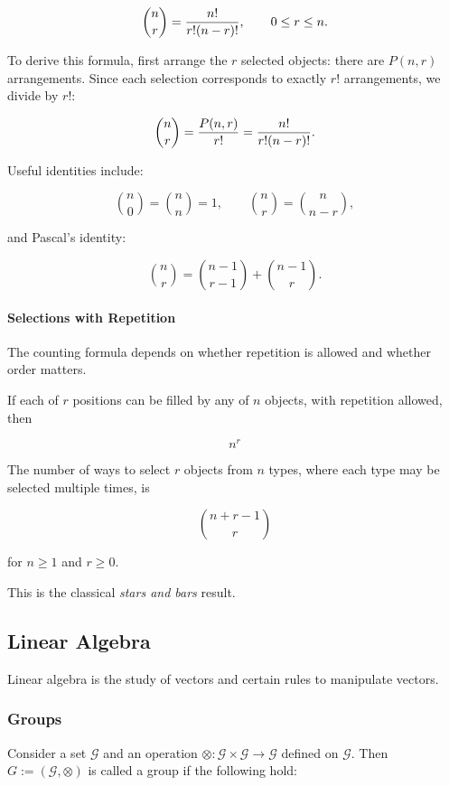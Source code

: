 \documentclass{article}
\begin{document}
\[
    \binom{n}{r} = \frac{n!}{r!(n-r)!}, \\
    \qquad 0 \leq r \leq n.
\]

To derive this formula, first arrange the \(r\) selected objects: there
are \(P(n,r)\) arrangements. Since each selection corresponds to exactly
\(r!\) arrangements, we divide by \(r!\):

\[
    \binom{n}{r} \\
    = \frac{P(n,r)}{r!} \\
    = \frac{n!}{r!(n-r)!}.
\]

Useful identities include:

\[
    \binom{n}{0} = \binom{n}{n} = 1,
    \qquad
    \binom{n}{r} = \binom{n}{n-r},
\]

and Pascal's identity:

\[
    \binom{n}{r}
    = \binom{n-1}{r-1} + \binom{n-1}{r}.
\]

\paragraph{Selections with Repetition}\label{selections-with-repetition}

The counting formula depends on whether repetition is allowed and
whether order matters.

If each of \(r\) positions can be filled by any of \(n\) objects, with
repetition allowed, then

\[n^r\]

The number of ways to select \(r\) objects from \(n\) types, where each
type may be selected multiple times, is

\[\binom{n+r-1}{r}\]

for \(n \geq 1\) and \(r \geq 0\).

This is the classical \emph{stars and bars} result.

\subsection{Linear Algebra}\label{linear-algebra}

Linear algebra is the study of vectors and certain rules to manipulate
vectors.

\subsubsection{Groups}\label{groups}

Consider a set \(\mathcal{G}\) and an operation
\(\otimes : \mathcal{G} \times
\mathcal{G} \to \mathcal{G}\) defined on \(\mathcal{G}\). Then
\(G := (\mathcal{G},
\otimes)\) is called a group if the following hold:
\end{document}
